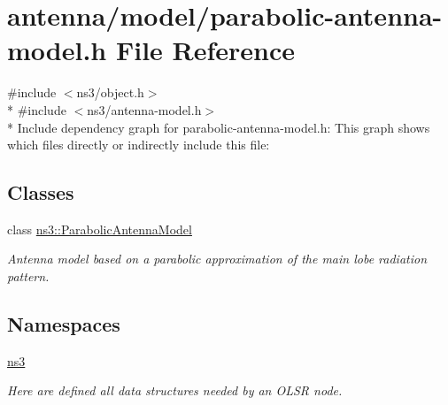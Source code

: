 \hypertarget{parabolic-antenna-model_8h}{}\section{antenna/model/parabolic-\/antenna-\/model.h File Reference}
\label{parabolic-antenna-model_8h}
{\ttfamily \#include $<$ns3/object.\+h$>$}\\*
{\ttfamily \#include $<$ns3/antenna-\/model.\+h$>$}\\*
Include dependency graph for parabolic-\/antenna-\/model.h\+:
This graph shows which files directly or indirectly include this file\+:
\subsection*{Classes}
\begin{DoxyCompactItemize}
\item 
class \hyperlink{classns3_1_1ParabolicAntennaModel}{ns3\+::\+Parabolic\+Antenna\+Model}
\begin{DoxyCompactList}\small\item\em Antenna model based on a parabolic approximation of the main lobe radiation pattern. \end{DoxyCompactList}\end{DoxyCompactItemize}
\subsection*{Namespaces}
\begin{DoxyCompactItemize}
\item 
 \hyperlink{namespacens3}{ns3}
\begin{DoxyCompactList}\small\item\em Here are defined all data structures needed by an O\+L\+SR node. \end{DoxyCompactList}\end{DoxyCompactItemize}

